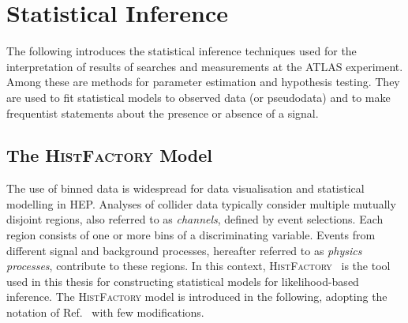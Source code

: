 \section{Statistical Inference}%
\label{sec:statistical_inference}

The following introduces the statistical inference techniques used for the
interpretation of results of searches and measurements at the ATLAS experiment.
Among these are methods for parameter estimation and hypothesis testing. They
are used to fit statistical models to observed data (or pseudodata) and to make
frequentist statements about the presence or absence of a signal.


\subsection{The \textsc{HistFactory} Model}%
\label{sec:histfactory}

The use of binned data
is widespread for data visualisation and statistical modelling in HEP. Analyses
of collider data typically consider multiple mutually disjoint regions, also
referred to as \emph{channels}, defined by event selections. Each region
consists of one or more bins of a discriminating variable. Events from different
signal and background processes, hereafter referred to as \emph{physics
  processes}, contribute to these regions. In this context,
\textsc{HistFactory}~\cite{cranmer2012} is the tool used in this thesis for
constructing statistical models for likelihood-based inference. The
\textsc{HistFactory} model is introduced in the following, adopting the notation
of Ref.~\cite{cranmer2012} with few modifications.

